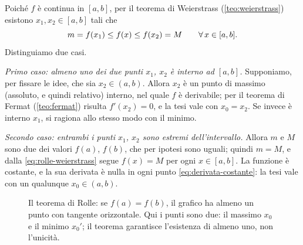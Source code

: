 \begin{dimostrazione}
Poiché $f$ è continua in $[a,b]$, per il teorema di Weierstrass (\cref{teo:weierstrass})
esistono $x_{1},x_{2}\in[a,b]$ tali che
\begin{equation}\label{eq:rolle-weierstrass}
  m=f(x_{1})\le f(x)\le f(x_{2})=M \qquad\forall\, x\in[a,b].
\end{equation}
Distinguiamo due casi.

\emph{Primo caso: almeno uno dei due punti $x_{1}$, $x_{2}$ è interno ad $[a,b]$.}
Supponiamo, per fissare le idee, che sia $x_{2}\in(a,b)$. Allora $x_{2}$ è un punto di
massimo (assoluto, e quindi relativo) interno, nel quale $f$ è derivabile; per il
teorema di Fermat (\cref{teo:fermat}) risulta $f'(x_{2})=0$, e la tesi vale con
$x_{0}=x_{2}$. Se invece è interno $x_{1}$, si ragiona allo stesso modo con il minimo.

\emph{Secondo caso: entrambi i punti $x_{1}$, $x_{2}$ sono estremi dell'intervallo.}
Allora $m$ e $M$ sono due dei valori $f(a)$, $f(b)$, che per ipotesi sono uguali;
quindi $m=M$, e dalla \eqref{eq:rolle-weierstrass} segue $f(x)=M$ per ogni $x\in[a,b]$.
La funzione è costante, e la sua derivata è nulla in ogni punto
\eqref{eq:derivata-costante}: la tesi vale con un qualunque $x_{0}\in(a,b)$.
\end{dimostrazione}

\begin{figure}[htb]
\centering
{}
\caption{Il teorema di Rolle: se $f(a)=f(b)$, il grafico ha almeno un punto con
tangente orizzontale. Qui i punti sono due: il massimo $x_{0}$ e il minimo $x_{0}'$; il
teorema garantisce l'esistenza di almeno uno, non l'unicità.}
\label{fig:rolle}
\end{figure}


